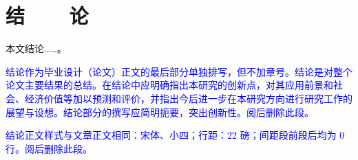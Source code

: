 %
%
%
%
%
%

\chapter*{\vskip 10bp\textmd{结~~~~论} \vskip -6bp}


本文结论……。\cite{dengImageNetLargescaleHierarchical2010}

\textcolor{blue}{结论作为毕业设计（论文）正文的最后部分单独排写，但不加章号。结论是对整个论文主要结果的总结。在结论中应明确指出本研究的创新点，对其应用前景和社会、经济价值等加以预测和评价，并指出今后进一步在本研究方向进行研究工作的展望与设想。结论部分的撰写应简明扼要，突出创新性。阅后删除此段。}

\textcolor{blue}{结论正文样式与文章正文相同：宋体、小四；行距：22 磅；间距段前段后均为 0 行。阅后删除此段。}
